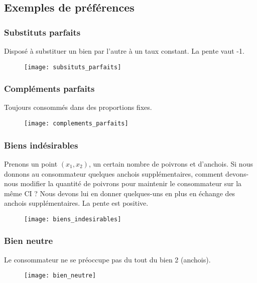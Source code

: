 \subsection{Exemples de préférences}

\subsubsection{Substituts parfaits}

Disposé à substituer un bien par l’autre à un taux constant. La pente vaut -1.
\begin{figure}[H]
	\centering
	\texttt{[image: subsituts\_parfaits]}
\end{figure}

\subsubsection{Compléments parfaits}

Toujours consommés dans des proportions fixes.
\begin{figure}[H]
	\centering
	\texttt{[image: complements\_parfaits]}
\end{figure}


\subsubsection{Biens indésirables}

Prenons un point $(x_1, x_2)$, un certain nombre de poivrons et d’anchois. Si nous donnons au consommateur quelques anchois supplémentaires, comment devons-nous modifier la quantité de poivrons pour maintenir le consommateur sur la même CI ? Nous devons lui en donner quelques-uns en plus en échange des anchois supplémentaires. La pente est positive.
\begin{figure}[H]
	\centering
	\texttt{[image: biens\_indesirables]}
\end{figure}

\subsubsection{Bien neutre}

Le consommateur ne se préoccupe pas du tout du bien 2 (anchois).
\begin{figure}[H]
	\centering
	\texttt{[image: bien\_neutre]}
\end{figure}

